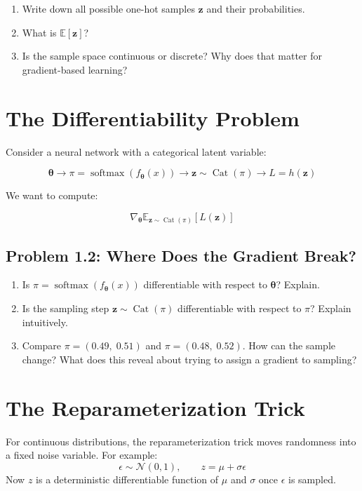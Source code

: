 \documentclass[11pt]{article}
\newcommand{\E}{\mathbb{E}}
\newcommand{\bz}{\mathbf{z}}
\newcommand{\btheta}{\boldsymbol{\theta}}
\begin{document}
\begin{enumerate}[label=(\alph*)]
    \item Write down all possible one-hot samples $\bz$ and their probabilities.
    \item What is $\E[\bz]$?
    \item Is the sample space continuous or discrete? Why does that matter for gradient-based learning?
\end{enumerate}

\section{The Differentiability Problem}

Consider a neural network with a categorical latent variable:

\[
\btheta \longrightarrow \pi = \operatorname{softmax}(f_{\btheta}(x)) \longrightarrow \bz \sim \operatorname{Cat}(\pi) \longrightarrow L = h(\bz)
\]

We want to compute:

\[
\nabla_{\btheta} \E_{\bz \sim \operatorname{Cat}(\pi)}[L(\bz)]
\]

\subsection*{Problem 1.2: Where Does the Gradient Break?}

\begin{enumerate}[label=(\alph*)]
    \item Is $\pi = \operatorname{softmax}(f_{\btheta}(x))$ differentiable with respect to $\btheta$? Explain.
    \item Is the sampling step $\bz \sim \operatorname{Cat}(\pi)$ differentiable with respect to $\pi$? Explain intuitively.
    \item Compare $\pi = (0.49,\; 0.51)$ and $\pi = (0.48,\; 0.52)$. How can the sample change? What does this reveal about trying to assign a gradient to sampling?
\end{enumerate}

\section{The Reparameterization Trick}

\begin{keyidea}
For continuous distributions, the reparameterization trick moves randomness into a fixed noise variable. For example:
\[
\epsilon \sim \mathcal{N}(0,1), \qquad z = \mu + \sigma \epsilon
\]
Now $z$ is a deterministic differentiable function of $\mu$ and $\sigma$ once $\epsilon$ is sampled.
\end{keyidea}
\end{document}
